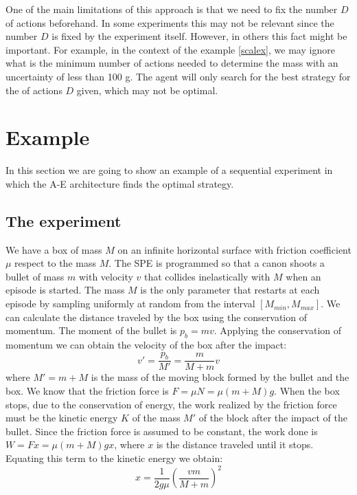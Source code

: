 \documentclass[11pt,a4paper,twoside]{report}
\newcommand{\+}{\textnormal{+} }
\theoremstyle{definition}
\numberwithin{equation}{chapter}
\begin{document}
One of the main limitations of this approach is that we need to fix the number
$D$ of actions beforehand. In some experiments this may not be relevant since
the number $D$ is fixed by the experiment itself. However, in others this fact
might be important. For example, in the context of the example \ref{scalex}, we
may ignore what is the minimum number of actions needed to determine the mass
with an uncertainty of less than 100 g. The agent will only search for the best
strategy for the of actions $D$ given, which may not be optimal.


\section{Example}

In this section we are going to show an example of a sequential experiment
in which the A-E architecture finds the optimal strategy.

\subsection{The experiment}

We have a box of mass $M$ on an infinite horizontal surface with friction
coefficient $\mu$ respect to the mass $M$. The SPE is programmed so that a canon
shoots a bullet of mass $m$ with velocity $v$ that collides inelastically with
$M$ when an episode is started. The mass $M$ is the only parameter that restarts
at each episode by sampling uniformly at random from the interval
$[M_{min}, M_{max}]$. We can calculate the distance traveled by the box using
the conservation of momentum. The moment of the bullet is $p_b=mv$. Applying the
conservation of momentum we can obtain the velocity of the box after the impact:
\begin{equation}
  v' = \frac{p_b}{M'}=\frac{m}{M+m}v
\end{equation}
where $M'=m+M$ is the mass of the moving block formed by the bullet and the box.
 We know that the friction force is $F=\mu N=\mu (m+M)g$. When the box stops,
 due to the conservation of energy, the work realized by the friction force must
 be the kinetic energy $K$ of the mass $M'$ of the block after the impact of the
 bullet. Since the friction force is assumed to be constant, the work done is
 $W=Fx=\mu (m+M)gx$, where $x$ is the distance traveled until it stops. Equating
 this term to the kinetic energy we obtain:
\begin{equation}
  \label{displacement} 
  x=\frac{1}{2g\mu}\left(\frac{vm}{M+m} \right)^2
\end{equation}
\end{document}
